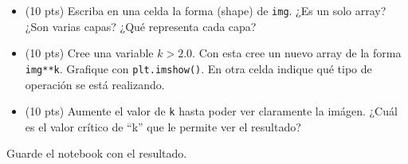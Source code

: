 \documentclass{article}
\begin{document}
\begin{itemize}
\item (10 pts) Escriba en una celda la forma (shape) de \texttt{img}.
  ¿Es un solo array? ¿Son varias capas? ¿Qué representa cada capa?
\item (10 pts) Cree una variable $k>2.0$. Con esta cree un nuevo array
  de la forma \texttt{img**k}. Grafique con \texttt{plt.imshow()}.
  En otra celda indique qué tipo de operación se está realizando.
\item (10 pts) Aumente el valor de \texttt{k} hasta poder ver claramente la
  imágen. ¿Cuál es el valor crítico de ``k'' que le permite ver el resultado?
\end{itemize}
Guarde el notebook con el resultado.
\end{document}
